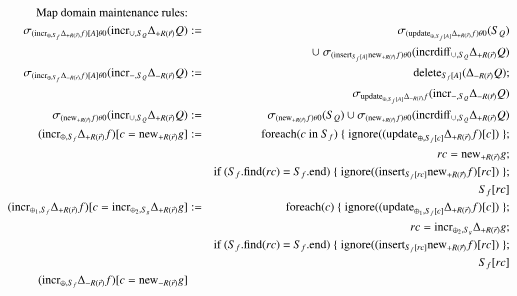 \documentclass{article}
\begin{document}
%
\begin{figure*}
\begin{eqnarray}
\mbox{Map domain maintenance rules:} && \nonumber\\
\label{eq:md1}
\sigma_{(\algincr_{\oplus, S_f} \Delta_{+R(\vec{r})} f)[A] \theta 0} (\algincr_{\cup, S_Q}
\Delta_{+R(\vec{r})} Q)
&:=&
\sigma_{(\algupdate_{\oplus, S_{f}[A]} \Delta_{+R(\vec{r})} f) \theta 0} (S_Q)
\\
\nonumber && 
\cup\; 
\sigma_{(\alginsert_{S_{f}[A]} \algnew_{+R(\vec{r})} f) \theta 0}
(\algincrdiff_{\cup, S_Q} \Delta_{+R(\vec{r})} Q)
\\
\label{eq:md2}
\sigma_{(\algincr_{\oplus, S_f} \Delta_{-R(\vec{r})} f)[A] \theta 0}
(\algincr_{-,S_Q} \Delta_{-R(\vec{r})}Q) &:=&
\algdelete_{S_f[A]}(\Delta_{-R(\vec{r})} Q);
\\
\nonumber &&
\sigma_{\algupdate_{\oplus, S_f[A]} \Delta_{-R(\vec{r})}f}
(\algincr_{-,S_Q} \Delta_{-R(\vec{r})} Q)
\\
\label{eq:md3}
\sigma_{(\algnew_{+R(\vec{r})} f) \theta 0} (\algincr_{\cup, S_Q}
\Delta_{+R(\vec{r})} Q)
&:=&
\sigma_{(\algnew_{+R(\vec{r})} f) \theta 0} (S_Q)
\cup
\sigma_{(\algnew_{+R(\vec{r})} f) \theta 0}
(\algincrdiff_{\cup, S_Q} \Delta_{+R(\vec{r})} Q)
\\
\label{eq:md4}
(\algincr_{\oplus, S_f} \Delta_{+R(\vec{r})} f)[c=\algnew_{+R(\vec{r})} g]
&:=&
\algfor(\mbox{$c$ in $S_f$}) \; \{ \; \mathrm{ignore}((\algupdate_{\oplus, S_{f}[c]} \Delta_{+R(\vec{r})} f)[c]) \; \};
\\
\nonumber && rc = \algnew_{+R(\vec{r})} g;
\\
\nonumber
&& \mbox{if ($S_f$.find($rc$) = $S_f$.end)}
\; \{ \; \mathrm{ignore}((\alginsert_{S_{f}[rc]} \algnew_{+R(\vec{r})} f)[rc]) \; \};
\\
\nonumber && S_{f}[rc]
\\
\label{eq:md5}
(\algincr_{\oplus_1, S_f} \Delta_{+R(\vec{r})} f)
[c=\algincr_{\oplus_2, S_g} \Delta_{+R(\vec{r})} g]
&:=&
\algfor(c) \; \{ \; \mathrm{ignore}((\algupdate_{\oplus_1, S_{f}[c]} \Delta_{+R(\vec{r})} f)[c]) \; \} ;
\\
\nonumber && rc = \algincr_{\oplus_2, S_g} \Delta_{+R(\vec{r})} g;
\\
\nonumber
&& \mbox{if ($S_f$.find($rc$) = $S_f$.end)}
\; \{ \; \mathrm{ignore}((\alginsert_{S_{f}[rc]} \algnew_{+R(\vec{r})} f)[rc]) \; \};
\\
\nonumber && S_{f}[rc]
\\
\label{eq:md6}
(\algincr_{\oplus, S_f}\Delta_{-R(\vec{r})} f)[c = \algnew_{-R(\vec{r})} g]

\end{eqnarray}
\end{figure*}
\end{document}
